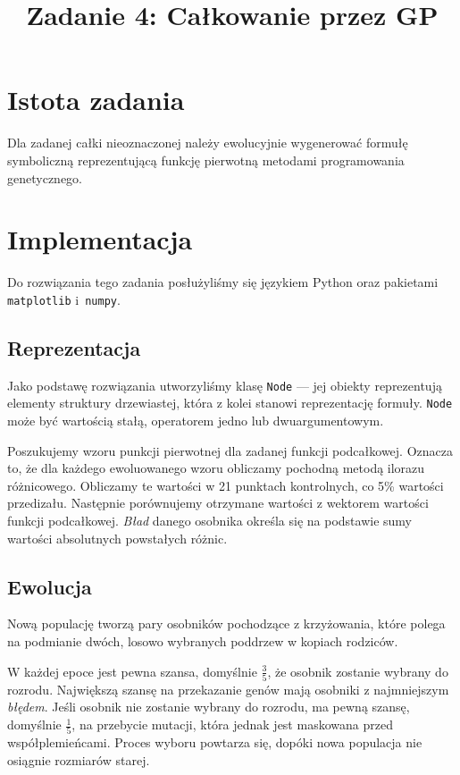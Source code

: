 \documentclass{classrep2}
\author{
  \studentinfo{Cezar Pokorski}{138077} \and
  \studentinfo{Artur Czajka}{137971} 
}
\title{Zadanie 4: Całkowanie przez GP}
\begin{document}
\maketitle

\section{Istota zadania}
Dla zadanej całki nieoznaczonej należy ewolucyjnie wygenerować formułę symboliczną reprezentującą funkcję pierwotną metodami programowania genetycznego.

\section{Implementacja}
Do rozwiązania tego zadania posłużyliśmy się językiem Python oraz pakietami \texttt{matplotlib} 
i~\texttt{numpy}. 

\subsection{Reprezentacja}
Jako podstawę rozwiązania utworzyliśmy klasę \texttt{Node} --- jej obiekty reprezentują elementy struktury drzewiastej, która z kolei stanowi reprezentację formuły. \texttt{Node} może być wartością stałą, operatorem jedno lub dwuargumentowym.

Poszukujemy wzoru punkcji pierwotnej dla zadanej funkcji podcałkowej. Oznacza to, że dla każdego ewoluowanego wzoru obliczamy pochodną metodą ilorazu różnicowego. Obliczamy te wartości w 21 punktach kontrolnych, co 5\% wartości przedizału. Następnie porównujemy otrzymane wartości z wektorem wartości funkcji podcałkowej. \textit{Bład} danego osobnika określa się na podstawie sumy wartości absolutnych powstałych różnic.

\subsection{Ewolucja}
Nową populację tworzą pary osobników pochodzące z krzyżowania, które polega na podmianie dwóch, losowo wybranych poddrzew w kopiach rodziców.

W każdej epoce jest pewna szansa, domyślnie $\frac{3}{5}$, że osobnik zostanie wybrany do rozrodu. Największą szansę na przekazanie genów mają osobniki z najmniejszym \textit{błędem}. Jeśli osobnik nie zostanie wybrany do rozrodu, ma pewną szansę, domyślnie $\frac{1}{5}$, na przebycie mutacji, która jednak jest maskowana przed współplemieńcami. Proces wyboru powtarza się, dopóki nowa populacja nie osiągnie rozmiarów starej.
\end{document}
